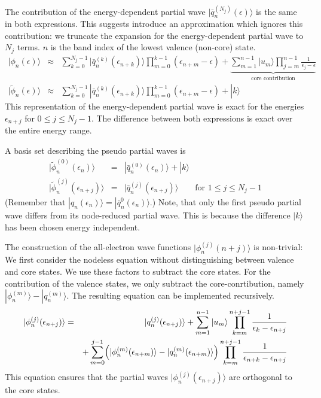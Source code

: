 \documentclass[11pt,a4paper]{report}
\begin{document}
The contribution of the energy-dependent partial wave
$|\bar{q}_n^{(N_j)}(\epsilon)\rangle$ is the same in both expressions.
This suggests introduce an approximation which ignores this
contribution: we truncate the expansion for the energy-dependent
partial wave to $N_j$ terms. $n$ is the band index of the lowest
valence (non-core) state.
\begin{eqnarray}
|\phi_n(\epsilon)\rangle
&\approx&
\sum_{k=0}^{N_j-1}
|\bar{q}_{n}^{(k)}(\epsilon_{n+k})\rangle
\prod_{m=0}^{k-1}(\epsilon_{n+m}-\epsilon)
+
\underbrace{
\sum_{m=1}^{n-1}|u_m\rangle\prod_{j=m}^{n-1}\frac{1}{\epsilon_j-\epsilon}
}_{\text{core contribution}}
\nonumber\\
|\tilde{\phi}_n(\epsilon)\rangle
&\approx&
\sum_{k=0}^{N_j-1}
|\bar{q}_{n}^{(k)}(\epsilon_{n+k})\rangle
\prod_{m=0}^{k-1}(\epsilon_{n+m}-\epsilon)
+|k\rangle
\label{eq:truncatedpspartialwithk}
\end{eqnarray}
This representation of the energy-dependent partial wave is exact for
the energies $\epsilon_{n+j}$ for $0\le j\le N_j-1$. The difference
between both expressions is exact over the entire energy range.

A basis set describing the pseudo partial waves is
\begin{eqnarray}
|\tilde{\phi}_n^{(0)}(\epsilon_n)\rangle&=&|\bar{q}_n^{(0)}(\epsilon_n)\rangle+|k\rangle
\nonumber\\
|\tilde{\phi}_n^{(j)}(\epsilon_{n+j})\rangle
&=&|\bar{q}_n^{(j)}(\epsilon_{n+j})\rangle
\qquad\text{for $1\le j\le N_j-1$}
\label{eq:tildephijfromqbar}
\end{eqnarray}
(Remember that
$|q_n(\epsilon_n)\rangle=|\bar{q}^{0}_n(\epsilon_n)\rangle$.)
Note, that only the first pseudo partial wave differs from its
node-reduced partial wave. This is because the difference $|k\rangle$
has been chosen energy independent.

The construction of the all-electron wave functions
$|\phi_n^{(j)}(n+j)\rangle$ is non-trivial: We first consider the
nodeless equation without distinguishing between valence and core
states. We use these factors to subtract the core states. For the
contribution of the valence states, we only subtract the
core-conrtibution, namely
$|\phi_n^{(m)}\rangle-|q_n^{(m)}\rangle$. The resulting equation can
be implemented recursively.
\begin{eqnarray}
|\phi_n^{(j)}(\epsilon_{n+j})\rangle&=&
|q_n^{(j)}(\epsilon_{n+j})\rangle
+\sum_{m=1}^{n-1}|u_m\rangle\prod_{k=m}^{n+j-1}\frac{1}{\epsilon_k-\epsilon_{n+j}}
\nonumber\\
&&
+\sum_{m=0}^{j-1}\Bigl(|\phi_n^{(m)}(\epsilon_{n+m})\rangle-|q_n^{(m)}(\epsilon_{n+m})\rangle\Bigr)
\prod_{k=m}^{n+j-1}\frac{1}{\epsilon_{n+k}-\epsilon_{n+j}}
\end{eqnarray}
This equation ensures that the partial waves
$|\phi_n^{(j)}(\epsilon_{n+j})\rangle$ are orthogonal to the core
states.
\end{document}
